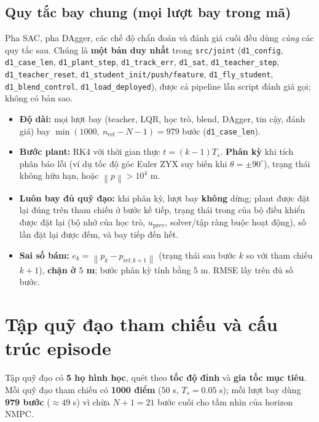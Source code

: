 \documentclass[11pt]{article}
\newcommand{\norm}[1]{\left\lVert #1 \right\rVert}
\begin{document}
\subsection{Quy tắc bay chung (mọi lượt bay trong mã)}
Pha SAC, pha DAgger, các chế độ chẩn đoán và đánh giá cuối đều dùng \emph{cùng} các quy tắc sau. Chúng là
\textbf{một bản duy nhất} trong \texttt{src/joint} (\texttt{d1\_\allowbreak config}, \texttt{d1\_\allowbreak case\_\allowbreak len},
\texttt{d1\_\allowbreak plant\_\allowbreak step}, \texttt{d1\_\allowbreak track\_\allowbreak err}, \texttt{d1\_\allowbreak sat},
\texttt{d1\_\allowbreak teacher\_\allowbreak step}, \texttt{d1\_\allowbreak teacher\_\allowbreak reset},
\texttt{d1\_\allowbreak student\_\allowbreak init/\allowbreak push/\allowbreak feature},
\texttt{d1\_\allowbreak fly\_\allowbreak student}, \texttt{d1\_\allowbreak blend\_\allowbreak control},
\texttt{d1\_\allowbreak load\_\allowbreak deployed}), được cả pipeline lẫn script đánh giá gọi; không có bản sao.
\begin{itemize}[leftmargin=1.4em,itemsep=1pt]
\item \textbf{Độ dài:} mọi lượt bay (teacher, LQR, học trò, blend, DAgger, tin cậy, đánh giá) bay
$\min(1000,\ n_{\mathrm{ref}}-N-1)=979$ bước (\texttt{d1\_case\_len}).
\item \textbf{Bước plant:} RK4 với thời gian thực $t=(k-1)T_s$. \textbf{Phân kỳ} khi tích phân báo lỗi
(ví dụ tốc độ góc Euler ZYX suy biến khi $\theta=\pm90^\circ$), trạng thái không hữu hạn, hoặc
$\norm{p}>10^4$ m.
\item \textbf{Luôn bay đủ quỹ đạo:} khi phân kỳ, lượt bay \textbf{không} dừng; plant được đặt lại đúng trên
tham chiếu ở bước kế tiếp, trạng thái trong của bộ điều khiển được đặt lại (bộ nhớ của học trò,
$u_{\mathrm{prev}}$, solver/tập ràng buộc hoạt động), số lần đặt lại được đếm, và bay tiếp
đến hết.
\item \textbf{Sai số bám:} $e_k=\norm{p_k-p_{\mathrm{ref},k+1}}$ (trạng thái sau bước $k$ so với tham chiếu
$k{+}1$), \textbf{chặn ở $5$ m}; bước phân kỳ tính bằng $5$ m. RMSE lấy trên đủ số bước.
\end{itemize}

\section{Tập quỹ đạo tham chiếu và cấu trúc episode}
Tập quỹ đạo có \textbf{5 họ hình học}, quét theo \textbf{tốc độ đỉnh} và \textbf{gia tốc mục tiêu}. Mỗi
quỹ đạo tham chiếu có \textbf{1000 điểm} ($50$ s, $T_s=0.05$ s); mỗi lượt bay dùng \textbf{979 bước}
($\approx49$ s) vì chừa $N{+}1=21$ bước cuối cho tầm nhìn của horizon NMPC.
\end{document}
